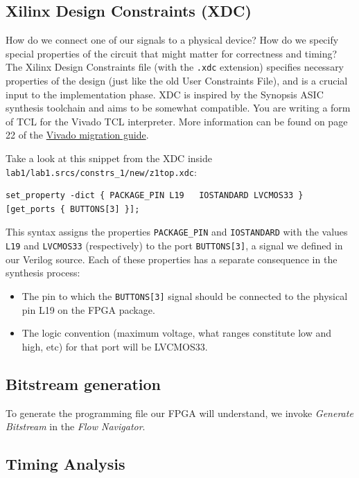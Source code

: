 \documentclass[11pt]{article}
\begin{document}
\subsection{Xilinx Design Constraints (XDC)}

How do we connect one of our signals to a physical device? How do we specify special properties of the circuit that might matter for correctness and timing? The Xilinx Design Constraints file (with the \verb|.xdc| extension) specifies necessary properties of the design (just like the old User Constraints File), and is a crucial input to the implementation phase. XDC is inspired by the Synopsis ASIC synthesis toolchain and aims to be somewhat compatible. You are writing a form of TCL for the Vivado TCL interpreter. More information can be found on page 22 of the \href{https://www.xilinx.com/support/documentation/sw_manuals/xilinx2015_2/ug911-vivado-migration.pdf}{Vivado migration guide}.

Take a look at this snippet from the XDC inside \verb|lab1/lab1.srcs/constrs_1/new/z1top.xdc|:

\begin{verbatim}
set_property -dict { PACKAGE_PIN L19   IOSTANDARD LVCMOS33 } [get_ports { BUTTONS[3] }];
\end{verbatim}

This syntax assigns the properties \verb|PACKAGE_PIN| and \verb|IOSTANDARD| with the values \verb|L19| and \verb|LVCMOS33| (respectively) to the port \verb|BUTTONS[3]|, a signal we defined in our Verilog source. Each of these properties has a separate consequence in the synthesis process:

\begin{itemize}
\item The pin to which the \verb|BUTTONS[3]| signal should be connected to the physical pin L19 on the FPGA package.
\item The logic convention (maximum voltage, what ranges constitute low and high, etc) for that port will be LVCMOS33.
\end{itemize}

\subsection{Bitstream generation}

To generate the programming file our FPGA will understand, we invoke \emph{Generate Bitstream} in the \emph{Flow Navigator}.

\subsection{Timing Analysis}
\end{document}
